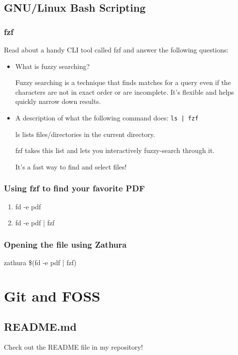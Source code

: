 \documentclass{article}
\begin{document}
\subsection{GNU/Linux Bash Scripting}
\subsubsection{fzf}
Read about a handy CLI tool called fzf and answer the following questions:
\begin{itemize}
    \item What is fuzzy searching? 

    Fuzzy searching is a technique that finds matches for a query even if the characters are not in exact order or are incomplete. It’s flexible and helps quickly narrow down results.
    
    \item A description of what the following command does: \texttt{ls | fzf}

    ls lists files/directories in the current directory.

fzf takes this list and lets you interactively fuzzy-search through it.

It’s a fast way to find and select files!
\end{itemize}

\subsubsection{Using fzf to find your favorite PDF}
\begin{enumerate}
    \item fd -e pdf

    \item fd -e pdf | fzf
\end{enumerate}

\subsubsection{Opening the file using Zathura}
zathura  \$(fd -e pdf  |  fzf)
\section{Git and FOSS}
\subsection{README.md}
Check out the README file in my repository!
\end{document}
